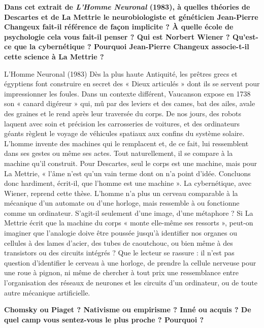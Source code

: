 \begin{keybox}[VI]
\textbf{Dans cet extrait de \textit{L’Homme Neuronal} (1983), à quelles théories de Descartes et de La Mettrie le neurobiologiste et généticien Jean-Pierre Changeux fait-il référence de façon implicite ? À quelle école de psychologie cela vous fait-il penser ? Qui est Norbert Wiener ? Qu’est-ce que la cybernétique ? Pourquoi Jean-Pierre Changeux associe-t-il cette science à La Mettrie ?}
\begin{lecture}{L’Homme Neuronal (1983)}
Dès la plus haute Antiquité, les prêtres grecs et égyptiens font construire en secret des « Dieux articulés » dont ils se servent pour impressionner les foules. Dans un contexte différent, Vaucanson expose en 1738 son « canard digéreur » qui, mû par des leviers et des cames, bat des ailes, avale des graines et le rend après leur traversée du corps. De nos jours, des robots laquent avec soin et précision les carrosseries de voitures, et des ordinateurs géants règlent le voyage de véhicules spatiaux aux confins du système solaire. L’homme invente des machines qui le remplacent et, de ce fait, lui ressemblent dans ses gestes ou même ses actes. Tout naturellement, il se compare à la machine qu’il construit. Pour Descartes, seul le corps est une machine, mais pour La Mettrie, « l’âme n’est qu’un vain terme dont on n’a point d’idée. Concluons donc hardiment, écrit-il, que l’homme est une machine ». La cybernétique, avec Wiener, reprend cette thèse. L’homme n’a plus un cerveau comparable à la mécanique d’un automate ou d’une horloge, mais ressemble à ou fonctionne comme un ordinateur. S’agit-il seulement d’une image, d’une métaphore ? Si La Mettrie écrit que la machine du corps « monte elle-même ses ressorts », peut-on imaginer que l’analogie doive être poussée jusqu’à identifier nos organes ou cellules à des lames d’acier, des tubes de caoutchouc, ou bien même à des transistors ou des circuits intégrés ? Que le lecteur se rassure : il n’est pas question d’identifier le cerveau à une horloge, de prendre la cellule nerveuse pour une roue à pignon, ni même de chercher à tout prix une ressemblance entre l’organisation des réseaux de neurones et les circuits d’un ordinateur, ou de toute autre mécanique artificielle.
\end{lecture}
\end{keybox}

\begin{keybox}[VII]
\textbf{Chomsky ou Piaget ? Nativisme ou empirisme ? Inné ou acquis ? De quel camp vous sentez-vous le plus proche ? Pourquoi ?}
\end{keybox}


